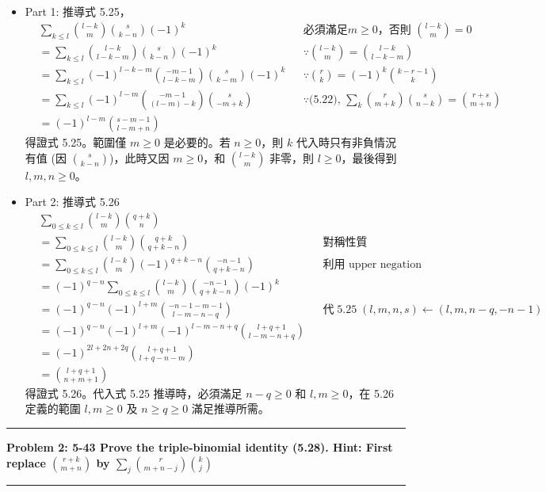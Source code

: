 \documentclass[11pt]{article}
\newcommand\question[2]{\vspace{.25in}\hrule\textbf{#1: #2}\vspace{.5em}\hrule\vspace{.10in}}
\begin{document}
\begin{itemize}
	\item Part 1: 推導式 5.25，
	\begin{align*}
		& \sum_{k \le l} \binom{l-k}{m} \binom{s}{k-n} (-1)^k 	&& \text{必須滿足} m \ge 0 \text{，否則 } \binom{l-k}{m} = 0 \\
		& = \sum_{k \le l} \binom{l-k}{l-k-m} \binom{s}{k-n} (-1)^k
		&& \because \binom{l-k}{m} = \binom{l-k}{l-k-m} \\
		& = \sum_{k \le l} (-1)^{l-k-m} \binom{-m-1}{l-k-m} \binom{s}{k-m} (-1)^k
		&& \because \binom{r}{k} = (-1)^k \binom{k-r-1}{k} \\
		& = \sum_{k \le l} (-1)^{l-m} \binom{-m-1}{(l-m)-k} \binom{s}{-m+k}
		&& \because \text{(5.22), } \sum_k \binom{r}{m+k} \binom{s}{n-k} = \binom{r+s}{m+n} \\
		& = (-1)^{l-m} \binom{s-m-1}{l-m+n}
	\end{align*}
	得證式 5.25。範圍僅 $m \ge 0$ 是必要的。若 $n \ge 0$，則 $k$ 代入時只有非負情況有值 (因 $\binom{s}{k-n}$)，此時又因 $m \ge 0$，和 $\binom{l-k}{m}$ 非零，則 $l \ge 0$，最後得到 $l, m, n \ge 0$。
	\item Part 2: 推導式 5.26
	\begin{align*}
		& \sum_{0 \le k \le l} \binom{l-k}{m} \binom{q+k}{n} \\
		&= \sum_{0 \le k \le l} \binom{l-k}{m} \binom{q+k}{q+k-n} && \text{對稱性質} \\
		&= \sum_{0 \le k \le l} \binom{l-k}{m} (-1)^{q+k-n}\binom{-n-1}{q+k-n} && \text{利用 upper negation}\\
		&= (-1)^{q-n} \sum_{0 \le k \le l} \binom{l-k}{m} \binom{-n-1}{q+k-n} (-1)^k \\
		&= (-1)^{q-n} (-1)^{l+m} \binom{-n-1-m-1}{l-m-n-q} 
			&& \text{代}\; 5.25 \;
				(l,m,n,s) \leftarrow (l, m, n-q, -n-1)\\
		&= (-1)^{q-n} (-1)^{l+m} (-1)^{l-m-n+q} \binom{l+q+1}{l-m-n+q} \\
		&= (-1)^{2l + 2n + 2q} \binom{l+q+1}{l+q-n-m} \\
		&= \binom{l+q+1}{n+m+1}
	\end{align*}
	得證式 5.26。代入式 5.25 推導時，必須滿足 $n-q \ge 0$ 和 $l, m \ge 0$，在 5.26 定義的範圍 $l, m \ge 0$ 及 $n \ge q \ge 0$ 滿足推導所需。
\end{itemize}

\question{Problem 2} {5-43 Prove the triple-binomial identity (5.28). Hint: First replace $\binom{r+k}{m+n}$ by $\sum_j \binom{r}{m+n-j} \binom{k}{j}$ }
\end{document}
